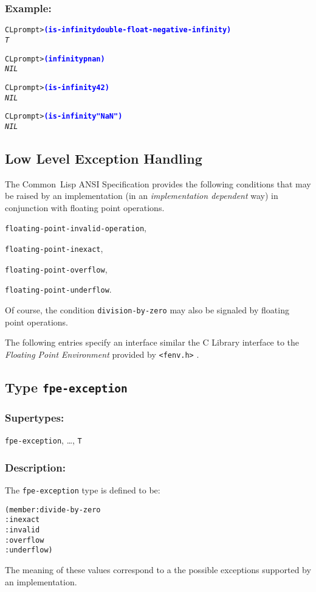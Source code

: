\documentclass[10pt,fleqn]{article}
\newcommand{\CL}{\textsf{Common~Lisp}}
\newcommand{\CLang}{\textsf{C}}
\newcommand{\code}[1]{\texttt{#1}}
\newcommand{\codeprompt}[1]{\textcolor{blue}{\textbf{#1}}}
\newcommand{\DDictionaryItem}[1]{\vspace*{6pt}\noindent\hrulefill\vspace*{-9pt}\subsection*{#1}}
\newcommand{\DSupertypes}{\subsubsection*{Supertypes:}}
\newcommand{\DDescription}{\subsubsection*{Description:}}
\begin{document}
\subsubsection*{Example:}

\begin{alltt}
CL prompt> \codeprompt{(is-infinity double-float-negative-infinity)}
\textit{T}

CL prompt> \codeprompt{(infinityp nan)}
\textit{NIL}

CL prompt> \codeprompt{(is-infinity 42)}
\textit{NIL}

CL prompt> \codeprompt{(is-infinity "NaN")}
\textit{NIL}
\end{alltt}



\subsection{Low Level Exception Handling}

The \CL{} ANSI Specification provides the following conditions that
may be raised by an implementation (in an \emph{implementation
  dependent} way) in conjunction with floating point operations.
\begin{description}
\item \code{floating-point-invalid-operation},
\item \code{floating-point-inexact},
\item \code{floating-point-overflow},
\item \code{floating-point-underflow}.
\end{description}
Of course, the condition \code{division-by-zero} may also be signaled
by floating point operations.


The following entries specify an interface similar the \CLang{} Library
interface to the \emph{Floating Point Environment} provided by
\verb|<fenv.h>| \cite{C18}.






\DDictionaryItem{Type \code{fpe-exception}}

\DSupertypes{}

\code{fpe-exception}, \ldots, \code{T}

\DDescription{}

The \code{fpe-exception} type is defined to be:
\begin{alltt}
(member :divide-by-zero
        :inexact
        :invalid
        :overflow
        :underflow)
\end{alltt}
The meaning of these values correspond to a the possible exceptions
supported by an implementation.
\end{document}
